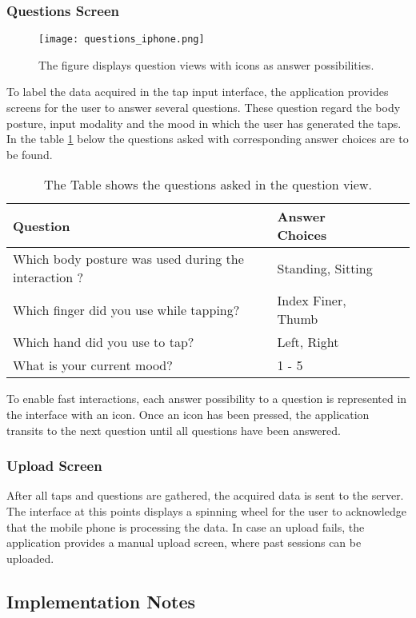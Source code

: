 \subsubsection{Questions Screen}
\begin{figure}[h!]
  \centering
  \texttt{[image: questions\_iphone.png]}
  \caption{The figure displays question views with icons as answer possibilities.}
\end{figure}

To label the data acquired in the tap input interface, the application provides screens for the user to answer several questions. These question regard the body posture, input modality and the mood in which the user has generated the taps. In the table \ref{table:questions} below the questions asked with corresponding answer choices are to be found.


\begin{table}
  \centering
  \begin{tabular}{| l | l | l | l |}
  \hline
  \textbf{Question} & \textbf{Answer Choices} \\ \hline
  Which body posture was used during the interaction ? & Standing, Sitting \\
  Which finger did you use while tapping? & Index Finer, Thumb \\
  Which hand did you use to tap? & Left, Right \\
  What is your current mood? & 1 - 5 \\
  \hline
  \end{tabular}
  \caption{The Table shows the questions asked in the question view.}\label{table:questions}
\end{table}

To enable fast interactions, each answer possibility to a question is represented in the interface with an icon. Once an icon has been pressed, the application transits to the next question until all questions have been answered.

\subsubsection{Upload Screen}
After all taps and questions are gathered, the acquired data is sent to the server. The interface at this points displays a spinning wheel for the user to acknowledge that the mobile phone is processing the data. In case an upload fails, the application provides a manual upload screen, where past sessions can be uploaded.
\subsection{Implementation Notes}
